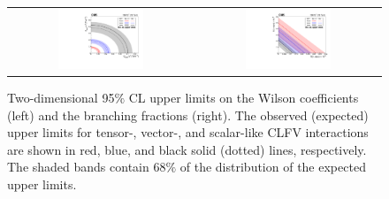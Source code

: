 \begin{figure}[tbh!]
 \begin{center}
 \begin{tabular}{cc}
  \includegraphics[width=0.48\textwidth]{figures/Part3/Results/Hist2D_WC}&
  \includegraphics[width=0.48\textwidth]{figures/Part3/Results/Hist2D_BR}\\
 \end{tabular}
 \caption{Two-dimensional 95$\%$ CL upper limits on the Wilson coefficients (left) and the branching fractions (right). The observed (expected) upper limits for tensor-, vector-, and scalar-like CLFV interactions are shown in red, blue, and black solid (dotted) lines, respectively. The shaded bands contain $68\%$ of the distribution of the expected upper limits.}
 \label{fig:2dlimit}
 \end{center}
\end{figure}